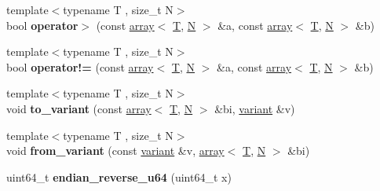 \begin{DoxyCompactItemize}
\item 
\mbox{\label{namespacefc_a4df925ca3ffbe076b82079d5e3028992}} 
{\footnotesize template$<$typename T , size\+\_\+t N$>$ }\\bool {\bfseries operator$>$} (const \mbox{\hyperlink{classfc_1_1array}{array}}$<$ \mbox{\hyperlink{struct_t}{T}}, \mbox{\hyperlink{group__types_gaf9c1edb0e0da55ec6ba09f32f6839529}{N}} $>$ \&a, const \mbox{\hyperlink{classfc_1_1array}{array}}$<$ \mbox{\hyperlink{struct_t}{T}}, \mbox{\hyperlink{group__types_gaf9c1edb0e0da55ec6ba09f32f6839529}{N}} $>$ \&b)
\item 
\mbox{\label{namespacefc_a5b4dc9c26c5afc71a8678abe3cd38c5b}} 
{\footnotesize template$<$typename T , size\+\_\+t N$>$ }\\bool {\bfseries operator!=} (const \mbox{\hyperlink{classfc_1_1array}{array}}$<$ \mbox{\hyperlink{struct_t}{T}}, \mbox{\hyperlink{group__types_gaf9c1edb0e0da55ec6ba09f32f6839529}{N}} $>$ \&a, const \mbox{\hyperlink{classfc_1_1array}{array}}$<$ \mbox{\hyperlink{struct_t}{T}}, \mbox{\hyperlink{group__types_gaf9c1edb0e0da55ec6ba09f32f6839529}{N}} $>$ \&b)
\item 
\mbox{\label{namespacefc_aed25e65168830dfe853c2b4fe6fff652}} 
{\footnotesize template$<$typename T , size\+\_\+t N$>$ }\\void {\bfseries to\+\_\+variant} (const \mbox{\hyperlink{classfc_1_1array}{array}}$<$ \mbox{\hyperlink{struct_t}{T}}, \mbox{\hyperlink{group__types_gaf9c1edb0e0da55ec6ba09f32f6839529}{N}} $>$ \&bi, \mbox{\hyperlink{classfc_1_1variant}{variant}} \&v)
\item 
\mbox{\label{namespacefc_a300e3455bf28e8d10fa1fd9b7137279c}} 
{\footnotesize template$<$typename T , size\+\_\+t N$>$ }\\void {\bfseries from\+\_\+variant} (const \mbox{\hyperlink{classfc_1_1variant}{variant}} \&v, \mbox{\hyperlink{classfc_1_1array}{array}}$<$ \mbox{\hyperlink{struct_t}{T}}, \mbox{\hyperlink{group__types_gaf9c1edb0e0da55ec6ba09f32f6839529}{N}} $>$ \&bi)
\item 
\mbox{\label{namespacefc_a27752b6734859d32c6377165db534bab}} 
uint64\+\_\+t {\bfseries endian\+\_\+reverse\+\_\+u64} (uint64\+\_\+t x)
\item 
\mbox{\label{namespacefc_afb668c55fd6ee73e1fcd67e77d8f6009}} 

\end{DoxyCompactItemize}
